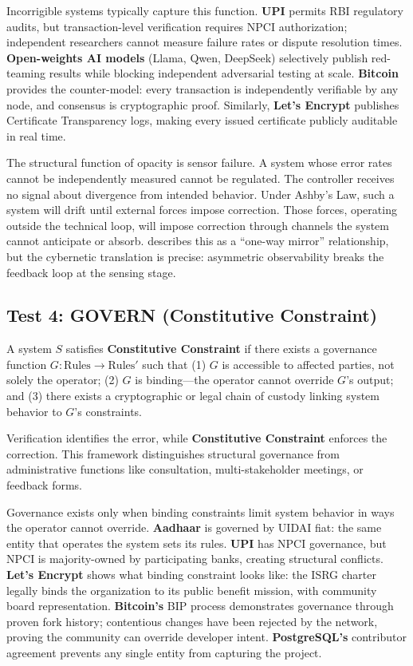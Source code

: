Incorrigible systems typically capture this function. \textbf{UPI} permits RBI regulatory audits, but transaction-level verification requires NPCI authorization; independent researchers cannot measure failure rates or dispute resolution times. \textbf{Open-weights AI models} (Llama, Qwen, DeepSeek) selectively publish red-teaming results while blocking independent adversarial testing at scale. \textbf{Bitcoin} provides the counter-model: every transaction is independently verifiable by any node, and consensus is cryptographic proof. Similarly, \textbf{Let's Encrypt} publishes Certificate Transparency logs, making every issued certificate publicly auditable in real time.

The structural function of opacity is sensor failure. A system whose error rates cannot be independently measured cannot be regulated. The controller receives no signal about divergence from intended behavior. Under Ashby's Law, such a system will drift until external forces impose correction. Those forces, operating outside the technical loop, will impose correction through channels the system cannot anticipate or absorb. \citet{pasquale2015} describes this as a ``one-way mirror'' relationship, but the cybernetic translation is precise: asymmetric observability breaks the feedback loop at the sensing stage.

\subsection{Test 4: GOVERN (Constitutive Constraint)}

\begin{definition}[GOVERN]
\label{def:govern}
A system $S$ satisfies \textbf{Constitutive Constraint} if there exists a governance function $G: \text{Rules} \to \text{Rules}'$ such that (1) $G$ is accessible to affected parties, not solely the operator; (2) $G$ is binding---the operator cannot override $G$'s output; and (3) there exists a cryptographic or legal chain of custody linking system behavior to $G$'s constraints.
\end{definition}

Verification identifies the error, while \textbf{Constitutive Constraint} enforces the correction. This framework distinguishes structural governance from administrative functions like consultation, multi-stakeholder meetings, or feedback forms.

Governance exists only when binding constraints limit system behavior in ways the operator cannot override. \textbf{Aadhaar} is governed by UIDAI fiat: the same entity that operates the system sets its rules. \textbf{UPI} has NPCI governance, but NPCI is majority-owned by participating banks, creating structural conflicts. \textbf{Let's Encrypt} shows what binding constraint looks like: the ISRG charter legally binds the organization to its public benefit mission, with community board representation. \textbf{Bitcoin's} BIP process demonstrates governance through proven fork history; contentious changes have been rejected by the network, proving the community can override developer intent. \textbf{PostgreSQL's} contributor agreement prevents any single entity from capturing the project.


